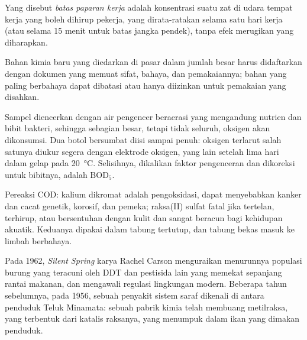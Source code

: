 \begin{definition}\label{def:b3:environmental-toxicology:oel}
Yang disebut \emph{batas paparan kerja} adalah
konsentrasi suatu zat di udara tempat kerja yang boleh dihirup pekerja,
yang dirata-ratakan selama satu hari kerja (atau selama 15 menit untuk batas jangka pendek), tanpa
efek merugikan yang diharapkan.
\end{definition}

Bahan kimia baru yang diedarkan di pasar dalam jumlah besar harus didaftarkan dengan
dokumen yang memuat sifat, bahaya, dan pemakaiannya; bahan yang paling berbahaya dapat
dibatasi atau hanya diizinkan untuk pemakaian yang disahkan.

\begin{inthelab}
Sampel diencerkan dengan air pengencer beraerasi yang mengandung nutrien dan
bibit bakteri, sehingga sebagian besar, tetapi tidak seluruh, oksigen akan dikonsumsi. Dua
botol bersumbat diisi sampai penuh: oksigen terlarut salah satunya diukur
segera dengan elektrode oksigen, yang lain setelah lima hari dalam gelap pada
\qty{20}{\celsius}. Selisihnya, dikalikan faktor pengenceran dan dikoreksi untuk bibitnya, adalah
$\mathrm{BOD_5}$.
\end{inthelab}

\begin{safety}{}
Pereaksi COD: kalium dikromat adalah pengoksidasi, dapat menyebabkan kanker dan
cacat genetik, korosif, dan pemeka; raksa(II) sulfat fatal jika
tertelan, terhirup, atau bersentuhan dengan kulit dan sangat beracun bagi kehidupan akuatik. Keduanya
dipakai dalam tabung tertutup, dan tabung bekas masuk ke limbah berbahaya.
\end{safety}

\begin{history}
Pada 1962, \textit{Silent Spring} karya Rachel Carson menguraikan menurunnya populasi burung yang teracuni oleh
DDT dan pestisida lain yang memekat sepanjang rantai makanan, dan mengawali regulasi
lingkungan modern. Beberapa tahun sebelumnya, pada 1956, sebuah penyakit sistem
saraf dikenali di antara penduduk Teluk Minamata: sebuah pabrik kimia telah
membuang metilraksa, yang terbentuk dari katalis raksanya, yang menumpuk
dalam ikan yang dimakan penduduk.
\end{history}


